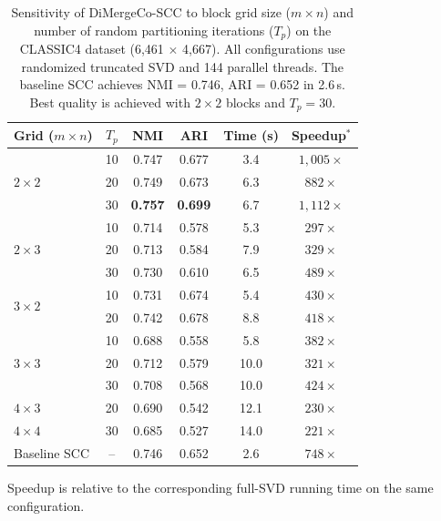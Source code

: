 \documentclass[journal]{IEEEtran}
\theoremstyle{definition}
\theoremstyle{remark} %
\begin{document}
{\color{blue}
\begin{table}[t]
    \centering
    \caption{Sensitivity of DiMergeCo-SCC to block grid size ($m \times n$) and number of random partitioning iterations ($T_p$) on the CLASSIC4 dataset (6,461 $\times$ 4,667). All configurations use randomized truncated SVD and 144 parallel threads. The baseline SCC achieves NMI = 0.746, ARI = 0.652 in 2.6\,s. Best quality is achieved with $2\times2$ blocks and $T_p=30$.}
    \label{tab:param_sens}
    \begin{threeparttable}
        \begin{tabular}{@{} l ccccc @{}}
            \toprule
            \textbf{Grid ($m{\times}n$)} & $T_p$ & \textbf{NMI} & \textbf{ARI} & \textbf{Time (s)} & \textbf{Speedup}$^{*}$ \\
            \midrule
            \multirow{3}{*}{$2\times2$}
                & 10 & 0.747          & 0.677          &  3.4  & $1{,}005\times$ \\
                & 20 & 0.749          & 0.673          &  6.3  & $882\times$     \\
                & 30 & \textbf{0.757} & \textbf{0.699} &  6.7  & $1{,}112\times$ \\
            \midrule
            \multirow{3}{*}{$2\times3$}
                & 10 & 0.714 & 0.578 &  5.3  & $297\times$ \\
                & 20 & 0.713 & 0.584 &  7.9  & $329\times$ \\
                & 30 & 0.730 & 0.610 &  6.5  & $489\times$ \\
            \midrule
            \multirow{2}{*}{$3\times2$}
                & 10 & 0.731 & 0.674 &  5.4  & $430\times$ \\
                & 20 & 0.742 & 0.678 &  8.8  & $418\times$ \\
            \midrule
            \multirow{3}{*}{$3\times3$}
                & 10 & 0.688 & 0.558 &  5.8  & $382\times$ \\
                & 20 & 0.712 & 0.579 & 10.0  & $321\times$ \\
                & 30 & 0.708 & 0.568 & 10.0  & $424\times$ \\
            \midrule
            $4\times3$  & 20 & 0.690 & 0.542 & 12.1  & $230\times$ \\
            $4\times4$  & 30 & 0.685 & 0.527 & 14.0  & $221\times$ \\
            \midrule
            Baseline SCC & -- & 0.746 & 0.652 &  2.6  & $748\times$ \\
            \bottomrule
        \end{tabular}
        \begin{tablenotes}
            \small
            \item[$*$] Speedup is relative to the corresponding full-SVD running time on the same configuration.
        \end{tablenotes}
    \end{threeparttable}
\end{table}
}
\end{document}
